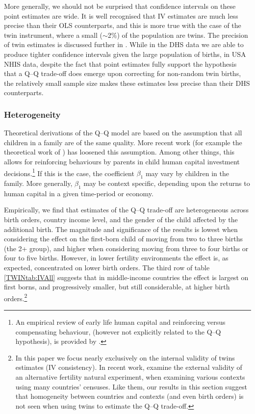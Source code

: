 \documentclass[subeqn]{article}
\begin{document}
\begin{spacing}{1.4}
More generally, we should not be surprised that confidence intervals on these
point estimates are wide.  It is well recognised that IV estimates are much
less precise than their OLS counterparts, and this is more true with the case
of the twin instrument, where a small ($\sim$2\%) of the population are twins.
The precision of twin estimates is discussed further in \citet{Angristetal2010}.
While in the DHS data we are able to produce tighter confidence intervals given
the large population of births, in USA NHIS data, despite the fact that point 
estimates fully support the hypothesis that a Q--Q trade-off does emerge upon 
correcting for non-random twin births, the relatively small sample size makes 
these estimates less precise than their DHS counterparts.


\subsubsection{Heterogeneity}
Theoretical derivations of the Q--Q model are based on the assumption that all
children in a family are of the same quality. More recent work (for example the 
theoretical work of \citet{AizerCunha2012}) has loosened this assumption. Among 
other things, this allows for reinforcing behaviours by parents in child human 
capital investment decisions.\footnote{An empirical review of early life human 
capital and reinforcing versus compensating behaviour, (however not explicitly 
related to the Q--Q hypothesis), is provided by \citet{AlmondMazumder2013}.} If 
this is the case, the coefficient $\beta_1$ may vary by children in the family. 
More generally, $\beta_1$ may be context specific, depending upon the returns to 
human capital in a given time-period or economy.

Empirically, we find that estimates of the Q--Q trade-off are heterogeneous 
across birth orders, country income level, and the gender of the child affected 
by the additional birth. The magnitude and significance of the results is lowest 
when considering the effect on the first-born child of moving from two to three 
births (the 2+ group), and higher when considering moving from three to four 
births or four to five births. However, in lower fertility environments the 
effect is, as expected, concentrated on lower birth orders. The third row of 
table \ref{TWINtab:IVAll} suggests that in middle-income countries the effect is 
largest on first borns, and progressively smaller, but still considerable, at 
higher birth orders.\footnote{In this paper we focus nearly exclusively on
the internal validity of twins estimates (IV consistency).  In recent work,
\citet{Deheijaetal2015} examine the external validity of an alternative 
fertility natural experiment, when examining various contexts using many
countries' censuses.  Like them, our results in this section suggest that
homogeneity between countries and contexts (and even birth orders) is not
seen when using twins to estimate the Q--Q trade-off.}


\end{spacing}
\end{document}

